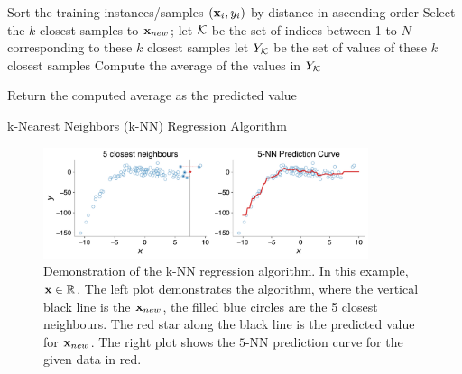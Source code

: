 \begin{boxedstuff}
    \begin{algorithm}[H]
    \SetAlgoLined
    \BlankLine
    Sort the training instances/samples $\left( \mathbf{x}_i, y_i \right)$ by distance in ascending order\;
    Select the $k$ closest samples to $\mathbf{x}_{new}$; let $\mathcal{K}$ be the set of indices between 1 to $N$ corresponding to these $k$ closest samples\; let $Y_{\mathcal{K}}$ be the set of values of these $k$ closest samples\;
    \BlankLine
    Compute the average of the values in $Y_{\mathcal{K}}$\;
    
    Return the computed average as the predicted value\;
    \caption{k-Nearest Neighbors (k-NN) Regression Algorithm}
    \label{alg:ch01-knn-reg}
    \end{algorithm}
\end{boxedstuff}

\begin{figure}
    \centering
    \includegraphics[width=0.85\textwidth]{figure/chapter01/knn-reg.pdf}
    \caption{Demonstration of the k-NN regression algorithm. In this example, $\mathbf{x} \in \mathbb{R}$. The left plot demonstrates the algorithm, where the vertical black line is the $\mathbf{x}_{new}$, the filled blue circles are the 5 closest neighbours. The red star along the black line is the predicted value for $\mathbf{x}_{new}$. The right plot shows the $5$-NN prediction curve for the given data in red.}
    \label{fig:ch01-knn-reg-demo}
\end{figure}

